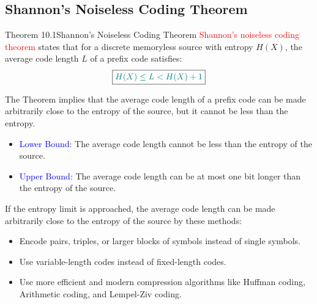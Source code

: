 \documentclass{book}
\begin{document}
\subsection{Shannon's Noiseless Coding Theorem}
\begin{thmBox}{Theorem 10.1}{Shannon's Noiseless Coding Theorem}
    \textcolor{red}{Shannon's noiseless coding theorem} states that for a discrete memoryless source with entropy $H(X)$, the average code length $L$ of a prefix code satisfies:
    \[
        \boxed{\textcolor{teal}{H(X) \leq L < H(X) + 1}}
    \]
\end{thmBox}
The Theorem implies that the average code length of a prefix code can be made arbitrarily close to the entropy of the source, but it cannot be less than the entropy.\begin{itemize}
    \item \textcolor{blue}{Lower Bound}: The average code length cannot be less than the entropy of the source.
    \item \textcolor{blue}{Upper Bound}: The average code length can be at most one bit longer than the entropy of the source.
\end{itemize}
If the entropy limit is approached, the average code length can be made arbitrarily close to the entropy of the source by these methods:
\begin{itemize}
    \item Encode pairs, triples, or larger blocks of symbols instead of single symbols.
    \item Use variable-length codes instead of fixed-length codes.
    \item Use more efficient and modern compression algorithms like Huffman coding, Arithmetic coding, and Lempel-Ziv coding.
\end{itemize}
\end{document}

